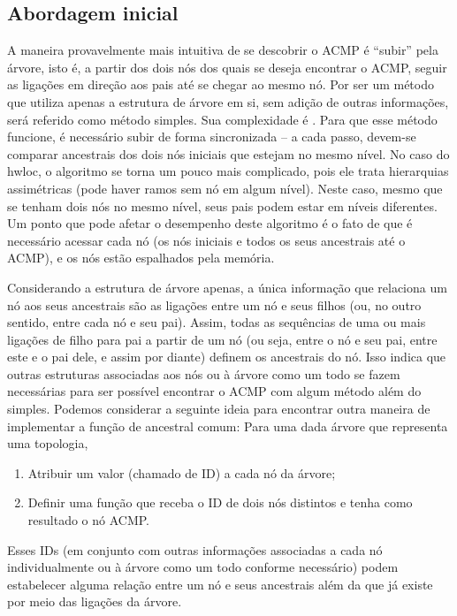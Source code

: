 \subsection{Abordagem inicial}

A maneira provavelmente mais intuitiva de se descobrir o ACMP é ``subir'' pela árvore, isto é, a partir dos dois nós dos quais se deseja encontrar o ACMP,
seguir as ligações em direção aos pais até se chegar ao mesmo nó.
Por ser um método que utiliza apenas a estrutura de árvore em si, sem adição de outras informações, será referido como método simples.
Sua complexidade é \Oalt.
Para que esse método funcione, é necessário subir de forma sincronizada -- a cada passo, devem-se comparar ancestrais dos dois nós iniciais que estejam no mesmo nível.
No caso do hwloc, o algoritmo se torna um pouco mais complicado, pois ele trata hierarquias assimétricas (pode haver ramos sem nó em algum nível).
Neste caso, mesmo que se tenham dois nós no mesmo nível, seus pais podem estar em níveis diferentes.
Um ponto que pode afetar o desempenho deste algoritmo é o fato de que é necessário acessar cada nó
(os nós iniciais e todos os seus ancestrais até o ACMP), e os nós estão espalhados pela memória.


Considerando a estrutura de árvore apenas, a única informação que relaciona um nó aos seus ancestrais
são as ligações entre um nó e seus filhos (ou, no outro sentido, entre cada nó e seu pai).
Assim, todas as sequências de uma ou mais ligações de filho para pai a partir de um nó (ou seja,
entre o nó e seu pai, entre este e o pai dele, e assim por diante) definem os ancestrais do nó.
Isso indica que outras estruturas associadas aos nós ou à árvore como um todo se fazem necessárias
para ser possível encontrar o ACMP com algum método além do simples.
Podemos considerar a seguinte ideia para encontrar outra maneira de implementar a função de ancestral comum:
Para uma dada árvore que representa uma topologia,
\begin{enumerate}
	\item Atribuir um valor (chamado de ID) a cada nó da árvore;
	\item Definir uma função \ACMPIDs que receba o ID de dois nós distintos e tenha como resultado o nó ACMP.
\end{enumerate}
Esses IDs (em conjunto com outras informações associadas a cada nó individualmente ou à árvore como um todo conforme necessário)
podem estabelecer alguma relação entre um nó e seus ancestrais além da que já existe por meio das ligações da árvore.

